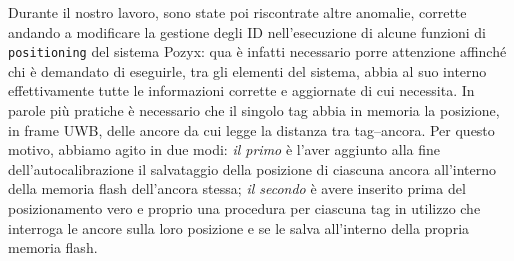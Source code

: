 Durante il nostro lavoro, sono state poi riscontrate altre anomalie, corrette andando a modificare la gestione degli ID nell'esecuzione di alcune funzioni di \verb|positioning| del sistema Pozyx: qua è infatti necessario porre attenzione affinché chi è demandato di eseguirle, tra gli elementi del sistema, abbia al suo interno effettivamente tutte le informazioni corrette e aggiornate di cui necessita. 
In parole pi\`u pratiche \`e necessario che il singolo tag abbia in memoria la posizione, in frame UWB, delle ancore da cui legge la distanza tra tag--ancora.
Per questo motivo, abbiamo agito in due modi: \textit{il primo} \`e l'aver aggiunto alla fine dell'autocalibrazione il salvataggio della posizione di ciascuna ancora all'interno della memoria flash dell'ancora stessa; \textit{il secondo} \`e avere inserito prima del posizionamento vero e proprio una procedura per ciascuna tag in utilizzo che interroga le ancore sulla loro posizione e se le salva all'interno della propria memoria flash.

